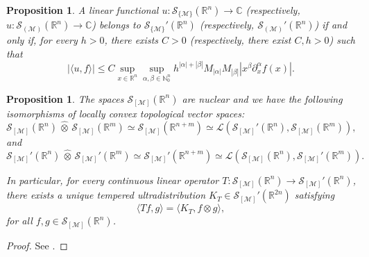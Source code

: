 \documentclass[11pt,reqno]{amsart}
\numberwithin{equation}{section}
\newtheorem{proposition}[theorem]{Proposition}
\newcommand{\R}{{\mathbb{R}}} %
\newcommand{\C}{{\mathbb{C}}} %
\newcommand{\N}{{\mathbb{N}}} %
\newcommand{\M}{{\mathcal{M}}} %
\begin{document}
\begin{proposition}
	A linear functional $u:\mathcal{S}_{\{\M\}}(\R^n)\to\C$ (respectively, $u:\mathcal{S}_{(\M)}(\R^n)\to\C$) belongs to $\mathcal{S}_{\{\M\}}'(\R^n)$ (respectively, $\mathcal{S}_{(\M)}'(\R^n)$) if and only if, for every $h>0$, there exists $C>0$ (respectively, there exist $C,h>0$) such that
	\[ |\langle u,f\rangle| \leq C\sup_{x\in\R^n}\sup_{\alpha,\beta\in\N_0^n} h^{|\alpha|+|\beta|}M_{|\alpha|}M_{|\beta|}|x^\beta\partial_x^\alpha f(x)|.\]
\end{proposition}



\begin{proposition}
	The spaces $\mathcal{S}_{[\M]}(\R^n)$ are nuclear and we have the following isomorphisms of locally convex topological vector spaces:
	\[\mathcal{S}_{[\M]}(\R^n)\,\widehat{\otimes}\, \mathcal{S}_{[\M]}(\R^m) \simeq \mathcal{S}_{[\M]}(\R^{n+m}) \simeq \mathcal{L}(\mathcal{S}_{[\M]}'(\R^n),\mathcal{S}_{[\M]}(\R^m)),\]
	and
	\[\mathcal{S}_{[\M]}'(\R^n)\,\widehat{\otimes}\, \mathcal{S}_{[\M]}'(\R^m) \simeq \mathcal{S}_{[\M]}'(\R^{n+m}) \simeq \mathcal{L}(\mathcal{S}_{[\M]}(\R^n),\mathcal{S}_{[\M]}'(\R^m)).\]
	
	In particular, for every continuous linear operator $T:\mathcal{S}_{[\M]}(\R^n)\to \mathcal{S}_{[\M]}'(\R^n)$, there exists a unique tempered ultradistribution $K_T\in \mathcal{S}_{[\M]}'(\R^{2n})$ satisfying
	\[\langle T f,g\rangle = \langle K_T, f\otimes g\rangle,\]
	for all $f,g\in \mathcal{S}_{[\M]}(\R^n)$.
\end{proposition}
%
\begin{proof}
	See \cite[Proposition 2]{Pran2013}.
\end{proof}
\end{document}
